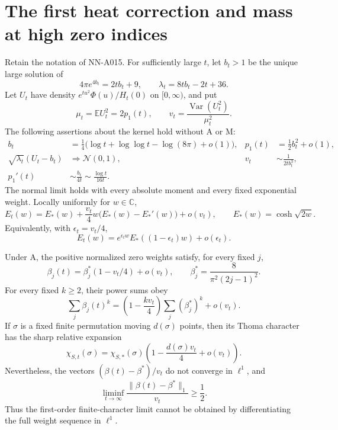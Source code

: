 \section{The first heat correction and mass at high zero indices}
\label{sec:analytic-heat-correction}

\begin{theorem}
Retain the notation of NN-A015. For sufficiently large $t$, let $b_t>1$
be the unique large solution of
\[
 4\pi e^{4b_t}=2tb_t+9,
 \qquad \lambda_t=8tb_t-2t+36.
\]
Let $U_t$ have density $e^{tu^2}\Phi(u)/H_t(0)$ on $[0,\infty)$,
and put
\[
 \mu_t=\mathbb E U_t^2=2p_1(t),\qquad
 v_t=\frac{\operatorname{Var}(U_t^2)}{\mu_t^2}.
\]
The following assertions about the kernel hold without A or M:
\begin{align}
 b_t&=\tfrac14\bigl(\log t+\log\log t-\log(8\pi)+o(1)\bigr),
 &p_1(t)&=\tfrac12b_t^2+o(1),\\
 \sqrt{\lambda_t}(U_t-b_t)&\Longrightarrow\mathcal N(0,1),
 &v_t&\sim\frac{1}{2tb_t^3},\\
 p_1'(t)&\sim\frac{b_t}{4t}\sim\frac{\log t}{16t}.
 \label{eq:heat-first-correction-scale}
\end{align}
The normal limit holds with every absolute moment and every fixed
exponential weight. Locally uniformly for $w\in\mathbb C$,
\begin{equation}\label{eq:heat-first-correction-entire}
 E_t(w)=E_*(w)+\frac{v_t}{4}w\bigl(E_*(w)-E_*'(w)\bigr)+o(v_t),
 \qquad E_*(w)=\cosh\sqrt{2w}.
\end{equation}
Equivalently, with $\epsilon_t=v_t/4$,
\[
 E_t(w)=e^{\epsilon_tw}E_*((1-\epsilon_t)w)+o(\epsilon_t).
\]

Under A, the positive normalized zero weights satisfy, for every
fixed $j$,
\begin{equation}\label{eq:heat-first-correction-weights}
 \beta_j(t)=\beta_j^*(1-v_t/4)+o(v_t),\qquad
 \beta_j^*=\frac{8}{\pi^2(2j-1)^2}.
\end{equation}
For every fixed $k\ge2$, their power sums obey
\[
 \sum_j\beta_j(t)^k
 =\left(1-\frac{k v_t}{4}\right)\sum_j(\beta_j^*)^k+o(v_t).
\]
If $\sigma$ is a fixed finite permutation moving $d(\sigma)$ points,
then its Thoma character has the sharp relative expansion
\begin{equation}\label{eq:heat-first-correction-character}
 \chi_{S,t}(\sigma)=\chi_{S,*}(\sigma)
           \left(1-\frac{d(\sigma)v_t}{4}+o(v_t)\right).
\end{equation}
Nevertheless, the vectors $(\beta(t)-\beta^*)/v_t$ do not converge
in $\ell^1$, and
\[
 \liminf_{t\to\infty}
       \frac{\|\beta(t)-\beta^*\|_1}{v_t}\ge\frac12.
\]
Thus the first-order finite-character limit cannot be obtained by
differentiating the full weight sequence in $\ell^1$.
\end{theorem}

